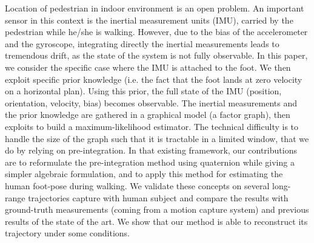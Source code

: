 %
%
Location of pedestrian in indoor environment is an open problem.
An important sensor in this context is the inertial measurement units (IMU), carried by the pedestrian while he/she is walking.
However, due to the bias of the accelerometer and the gyroscope, integrating directly the inertial measurements leads to tremendous drift, as the state of the system is not fully observable. 
In this paper, we consider the specific case where the IMU is attached to the foot.
We then exploit specific prior knowledge (i.e. the fact that the foot lands at zero velocity on a horizontal plan). Using this prior, the full state of the IMU (position, orientation, velocity, bias) becomes observable.
The inertial measurements and the prior knowledge are gathered in a graphical model (a factor graph), then exploits to build a maximum-likelihood estimator.
The technical difficulty is to handle the size of the graph such that it is tractable in a limited window, that we do by relying on pre-integration.
In that existing framework, our contributions are to reformulate the pre-integration method using quaternion while giving a simpler algebraic formulation, and to apply this method for estimating the human foot-pose during walking.
We validate these concepts on several long-range trajectories capture with human subject and compare the results with ground-truth measurements (coming from a motion capture system)  and previous results of the state of the art.
We show that our method is able to reconstruct its trajectory under some conditions.



